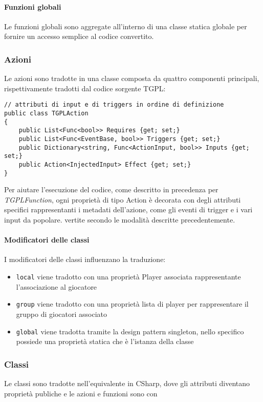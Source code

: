 \paragraph{Funzioni globali}
Le funzioni globali sono aggregate all'interno di una classe statica globale 
per fornire un accesso semplice al codice convertito.

\subsubsection{Azioni}
Le azioni sono tradotte in una classe composta da quattro componenti principali, rispettivamente tradotti dal codice sorgente TGPL:
\begin{lstlisting}[style=sharpc_small]
// attributi di input e di triggers in ordine di definizione
public class TGPLAction
{
    public List<Func<bool>> Requires {get; set;} 
    public List<Func<EventBase, bool>> Triggers {get; set;}
    public Dictionary<string, Func<ActionInput, bool>> Inputs {get; set;}
    public Action<InjectedInput> Effect {get; set;}
}
\end{lstlisting}
Per aiutare l'esecuzione del codice, come descritto in precedenza per \textit{TGPLFunction},
ogni proprietà di tipo Action è decorata con degli attributi specifici 
rappresentanti i metadati dell'azione, come gli eventi di trigger e i vari input da popolare.
vertite secondo le modalità descritte
precedentemente.

\paragraph*{Modificatori delle classi} I modificatori delle classi influenzano la traduzione:
\begin{itemize}
    \item \lstinline|local| viene tradotto con una proprietà Player associata rappresentante l'associazione al giocatore
    \item \lstinline|group| viene tradotto con una proprietà lista di player per rappresentare il gruppo di giocatori associato
    \item \lstinline|global| viene tradotta tramite la design pattern singleton, nello specifico possiede una proprietà statica che è l'istanza della classe
\end{itemize}

\subsubsection{Classi}
Le classi sono tradotte nell'equivalente in CSharp, dove gli attributi diventano 
proprietà publiche e le azioni e funzioni sono con

